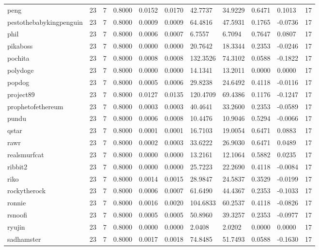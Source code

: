 \begin{table}[htbp]
\begin{tabular}{lllllllllll}
peng & 23 & 7 & 0.8000 & 0.0152 & 0.0170 & 42.7737 & 34.9229 & 0.6471 & 0.1013 & 17 \\
pestothebabykingpenguin & 23 & 7 & 0.8000 & 0.0009 & 0.0009 & 64.4816 & 47.5931 & 0.1765 & -0.0736 & 17 \\
phil & 23 & 7 & 0.8000 & 0.0006 & 0.0007 & 6.7557 & 6.7094 & 0.7647 & 0.0807 & 17 \\
pikaboss & 23 & 7 & 0.8000 & 0.0000 & 0.0000 & 20.7642 & 18.3344 & 0.2353 & -0.0246 & 17 \\
pochita & 23 & 7 & 0.8000 & 0.0008 & 0.0008 & 132.3526 & 74.3102 & 0.0588 & -0.1822 & 17 \\
polydoge & 23 & 7 & 0.8000 & 0.0000 & 0.0000 & 14.1341 & 13.2011 & 0.0000 & 0.0000 & 17 \\
popdog & 23 & 7 & 0.8000 & 0.0005 & 0.0006 & 29.8238 & 24.6492 & 0.4118 & -0.0116 & 17 \\
project89 & 23 & 7 & 0.8000 & 0.0127 & 0.0135 & 120.4709 & 69.4386 & 0.1176 & -0.1247 & 17 \\
prophetofethereum & 23 & 7 & 0.8000 & 0.0003 & 0.0003 & 40.4641 & 33.2600 & 0.2353 & -0.0589 & 17 \\
pundu & 23 & 7 & 0.8000 & 0.0006 & 0.0008 & 10.4476 & 10.9046 & 0.5294 & -0.0066 & 17 \\
qstar & 23 & 7 & 0.8000 & 0.0001 & 0.0001 & 16.7103 & 19.0054 & 0.6471 & 0.0883 & 17 \\
rawr & 23 & 7 & 0.8000 & 0.0002 & 0.0003 & 33.6222 & 26.9030 & 0.6471 & 0.0489 & 17 \\
realsmurfcat & 23 & 7 & 0.8000 & 0.0000 & 0.0000 & 13.2161 & 12.1064 & 0.5882 & 0.0235 & 17 \\
ribbit2 & 23 & 7 & 0.8000 & 0.0000 & 0.0000 & 25.7223 & 22.2690 & 0.4118 & -0.0084 & 17 \\
riko & 23 & 7 & 0.8000 & 0.0014 & 0.0015 & 28.9847 & 24.5837 & 0.3529 & -0.0199 & 17 \\
rockytherock & 23 & 7 & 0.8000 & 0.0006 & 0.0007 & 61.6490 & 44.4367 & 0.2353 & -0.1033 & 17 \\
ronnie & 23 & 7 & 0.8000 & 0.0016 & 0.0020 & 104.6833 & 60.2537 & 0.4118 & -0.0826 & 17 \\
rsnoofi & 23 & 7 & 0.8000 & 0.0005 & 0.0005 & 50.8960 & 39.3257 & 0.2353 & -0.0977 & 17 \\
ryujin & 23 & 7 & 0.8000 & 0.0000 & 0.0000 & 2.0408 & 2.0202 & 0.0000 & 0.0000 & 17 \\
sadhamster & 23 & 7 & 0.8000 & 0.0017 & 0.0018 & 74.8485 & 51.7493 & 0.0588 & -0.1630 & 17 \\

\end{tabular}
\end{table}
